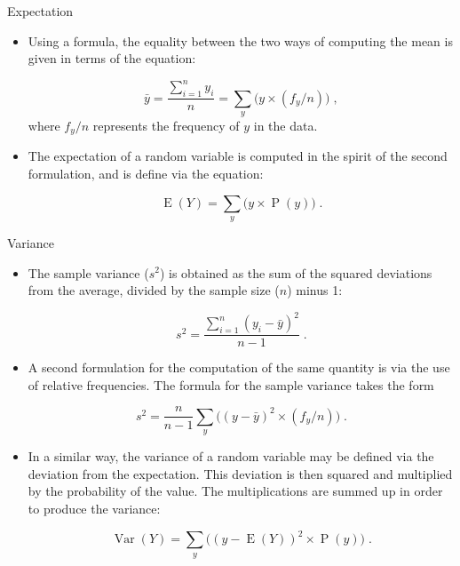 \documentclass[10pt]{beamer}\usepackage[]{graphicx}\usepackage[]{color}
\newcommand{\Var}{\operatorname{Var}}
\newcommand{\Expec}{\operatorname{E}}
\newcommand{\Prob}{\operatorname{P}}
\begin{document}
\begin{frame}[fragile]{Expectation}
	\small
	\begin{itemize}		
	
		\item Using a formula, the equality between the two ways of computing the mean is
		given in terms of the equation:
		
		$$\bar y = \frac{\sum_{i=1}^n y_i}{n} = \sum_y \big(y \times (f_y/n)\big)\;,$$
		where $f_y/n$ represents the frequency of $y$ in the data. 
		
		\item The expectation of a random variable is computed in the spirit of the
		second formulation, and is define via the equation:
		
		$$\Expec(Y) = \sum_y \big(y \times \Prob(y)\big)\;.$$
		
		
	\end{itemize}
	
\end{frame}



\begin{frame}[fragile]{Variance}
	\small
	\begin{itemize}		
		
		\item The sample variance ($s^2$) is obtained as the sum of the squared
		deviations from the average, divided by the sample size ($n$) minus 1:
		
		$$s^2 = \frac{\sum_{i=1}^n (y_i - \bar y)^2}{n-1}\;.$$ 
		
		\item  A second	formulation for the computation of the same quantity is via the use of
		relative frequencies. The formula for the sample variance takes the form
		
		$$s^2 = \frac{n}{n-1}\sum_y \big((y - \bar y)^2\times (f_y/n)\big)\;.$$
		
		
		\item In a similar way, the variance of a random variable may be defined via
		the deviation from the expectation. This deviation is
		then squared and multiplied by the probability of the value. The
		multiplications are summed up in order to produce the variance:
		
		$$\Var(Y) = \sum_y\big( (y-\Expec(Y))^2 \times \Prob(y)\big)\;.$$
		
	\end{itemize}
	
\end{frame}
\end{document}
